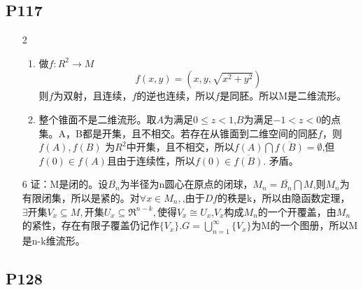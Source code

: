 \subsection{P117}
\begin{enumerate}[1]
    \item[2] 
    \begin{enumerate}[(1)]
        \item 做$f:R^2\rightarrow M$
        $$f(x,y)=(x,y,\sqrt{x^2+y^2})$$则$f$为双射，且连续，$f$的逆也连续，所以$f$是同胚。所以M是二维流形。
        \item 整个锥面不是二维流形。取$A$为满足$0\leqslant z<1$,$B$为满足$-1<z<0$的点集。A，B都是开集，且不相交。若存在从锥面到二维空间的同胚$f$，则$f(A),f(B)$ 为$R^2$中开集，且不相交，所以$f(A)\bigcap\overline{f(B)}=\emptyset$,但$f(0)\in f(A)$且由于连续性，所以$f(0)\in\overline{f(B)}$. 矛盾。\\  
    \end{enumerate}

    \item[6]
    证：M是闭的。设$\overline{B_n}$为半径为n圆心在原点的闭球，$M_n=\overline{B_n}\bigcap M$,则$M_n$为有限闭集，所以是紧的。对$\forall x\in M_n,$,由于$Df$的秩是k，所以由隐函数定理，$\exists \text{开集}V_x\subseteq M,\text{开集}U_x\subseteq \Re^{n-k},\text{使得}V_x\cong U_x$,${V_x}$构成$M_n$的一个开覆盖，由$M_n$的紧性，存在有限子覆盖仍记作$\{V_x\}$.$G=\bigcup\limits_{n=1}^{\infty}\{V_x\}$为M的一个图册，所以M是n-k维流形。
\end{enumerate}

\subsection{P128}

